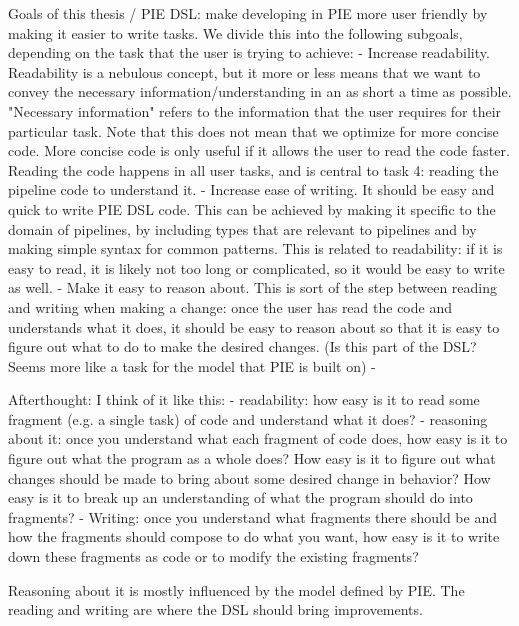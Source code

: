 Goals of this thesis / PIE DSL: make developing in PIE more user friendly by making it easier to write tasks.
We divide this into the following subgoals, depending on the task that the user is trying to achieve:
- Increase readability. Readability is a nebulous concept, but it more or less means that we want to convey the necessary information/understanding in an as short a time as possible. "Necessary information" refers to the information that the user requires for their particular task.
Note that this does not mean that we optimize for more concise code. More concise code is only useful if it allows the user to read the code faster.
Reading the code happens in all user tasks, and is central to task 4: reading the pipeline code to understand it.
- Increase ease of writing. It should be easy and quick to write PIE DSL code.
This can be achieved by making it specific to the domain of pipelines, by including types that are relevant to pipelines and by making simple syntax for common patterns.
This is related to readability: if it is easy to read, it is likely not too long or complicated, so it would be easy to write as well.
- Make it easy to reason about. This is sort of the step between reading and writing when making a change: once the user has read the code and understands what it does, it should be easy to reason about so that it is easy to figure out what to do to make the desired changes. (Is this part of the DSL? Seems more like a task for the model that PIE is built on)
- 


Afterthought: I think of it like this:
- readability: how easy is it to read some fragment (e.g. a single task) of code and understand what it does?
- reasoning about it: once you understand what each fragment of code does, how easy is it to figure out what the program as a whole does? How easy is it to figure out what changes should be made to bring about some desired change in behavior? How easy is it to break up an understanding of what the program should do into fragments?
- Writing: once you understand what fragments there should be and how the fragments should compose to do what you want, how easy is it to write down these fragments as code or to modify the existing fragments?

Reasoning about it is mostly influenced by the model defined by PIE.
The reading and writing are where the DSL should bring improvements.


